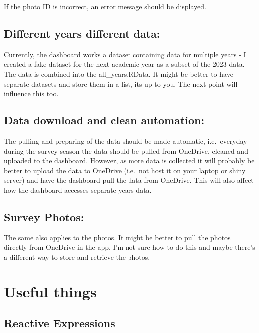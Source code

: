\documentclass[
]{book}
\begin{document}
If the photo ID is incorrect, an error message should be displayed.

\hypertarget{different-years-different-data}{%
\section{Different years different data:}\label{different-years-different-data}}

Currently, the dashboard works a dataset containing data for multiple years - I created a fake dataset for the next academic year as a subset of the 2023 data. The data is combined into the all\_years.RData. It might be better to have separate datasets and store them in a list, its up to you. The next point will influence this too.

\hypertarget{data-download-and-clean-automation}{%
\section{Data download and clean automation:}\label{data-download-and-clean-automation}}

The pulling and preparing of the data should be made automatic, i.e.~everyday during the survey season the data should be pulled from OneDrive, cleaned and uploaded to the dashboard. However, as more data is collected it will probably be better to upload the data to OneDrive (i.e.~not host it on your laptop or shiny server) and have the dashboard pull the data from OneDrive. This will also affect how the dashboard accesses separate years data.

\hypertarget{survey-photos}{%
\section{Survey Photos:}\label{survey-photos}}

The same also applies to the photos. It might be better to pull the photos directly from OneDrive in the app. I'm not sure how to do this and maybe there's a different way to store and retrieve the photos.

\hypertarget{useful-things}{%
\chapter{Useful things}\label{useful-things}}

\hypertarget{reactive-expressions}{%
\section{Reactive Expressions}\label{reactive-expressions}}
\end{document}
